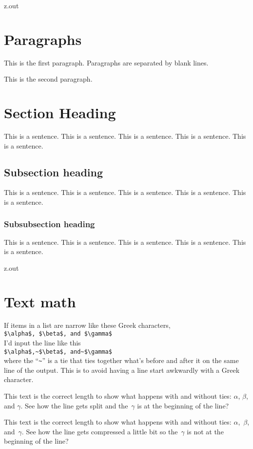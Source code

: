 \begin{VerbatimOut}{z.out}

  
\section{Paragraphs}

This is the first paragraph.
Paragraphs are separated by blank lines.

This is the second paragraph.


\section{Section Heading}

This is a sentence.
This is a sentence.
This is a sentence.
This is a sentence.
This is a sentence.


\subsection{Subsection heading}

This is a sentence.
This is a sentence.
This is a sentence.
This is a sentence.
This is a sentence.


\subsubsection{Subsubsection heading}

This is a sentence.
This is a sentence.
This is a sentence.
This is a sentence.
This is a sentence.
\end{VerbatimOut}

\MyIOT



\begin{VerbatimOut}{z.out}


\section{Text math}

If items in a list are narrow like these Greek characters,\\
     \verb+$\alpha$, $\beta$, and $\gamma$+\\
I'd input the line like this\\
     \verb+$\alpha$,~$\beta$, and~$\gamma$+\\
where the ``\verb+~+'' is a tie
that ties together what's before and after it on the same line of the output.
This is to avoid having a line start awkwardly with a Greek character.

This text is the correct length to show what happens with and without ties:
$\alpha$,
$\beta$,
and $\gamma$.
See how the line gets split
and the~$\gamma$ is at the beginning of the line?

This text is the correct length to show what happens with and without ties:
$\alpha$,~$\beta$,
and~$\gamma$.
See how the line gets compressed a little bit so the~$\gamma$
is not at the beginning of the line?
\end{VerbatimOut}

\MyIO
